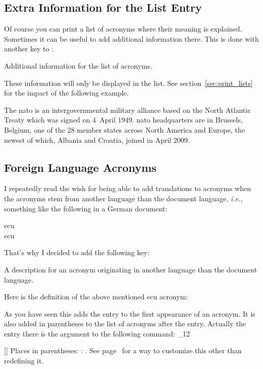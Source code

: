 \documentclass[load-preamble+]{cnltx-doc}
\makeatletter
\newcommand*\latin{\textit}
\renewenvironment{commands}
  {%
    \cnltx@set@catcode_{12}%
    \let\command\cnltx@command
    \cnltxlist
  }
  {\endcnltxlist}
\makeatother
\begin{document}
\subsection{Extra Information for the List Entry}
Of course you can print a list of acronyms where their meaning is explained.
Sometimes it can be useful to add additional information there.  This is done
with another key to :
\begin{options}
    Additional information for the list of acronyms.
\end{options}
These information will only be displayed in the list.  See
section~\vref{sec:print_lists} for the impact of the following example.

\begin{example}
  The \ac{nato} is an intergovernmental military alliance based on the
  North Atlantic Treaty which was signed on 4~April 1949. \ac{nato}
  headquarters are in Brussels, Belgium, one of the 28 member states
  across North America and Europe, the newest of which, Albania and
  Croatia, joined in April 2009.
\end{example}

\subsection{Foreign Language Acronyms}\label{ssec:foreign}
\noindent{}I repeatedly read the wish for being able to add
translations to acronyms when the acronyms stem from another language than the
document language, \latin{i.e.}, something like the following in a German 
document:
\begin{example}
  \ac{ecu}\\
  \ac{ecu}
\end{example}
That's why I decided to add the following key:
\begin{options}
    A description for an acronym originating in another language than the
    document language.
\end{options}

Here is the definition of the above mentioned \ac{ecu} acronym:
\begin{sourcecode}
\end{sourcecode}
As you have seen this adds the  entry to the first appearance
of an acronym.  It is also added in parentheses to the list of acronyms after
the  entry.  Actually the entry there is the argument to the
following command:
\begin{commands}
  \command{acroenparen}[]
    Places  in parentheses: :
    .  See page~\pageref{key:list-foreign-format} for a
    way to customize this other than redefining it.
\end{commands}
\end{document}
